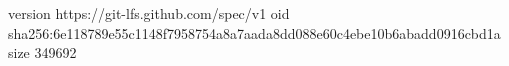 version https://git-lfs.github.com/spec/v1
oid sha256:6e118789e55c1148f7958754a8a7aada8dd088e60c4ebe10b6abadd0916cbd1a
size 349692
